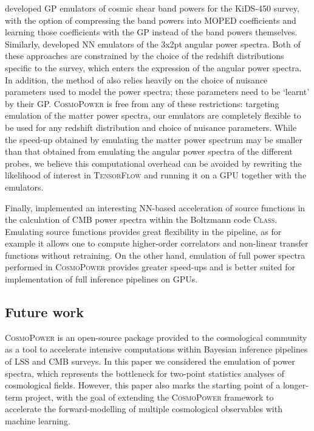\documentclass[fleqn,usenatbib]{mnras}
\begin{document}
\citet{Mootoovaloo20} developed GP emulators of cosmic shear band powers for the KiDS-450 survey, with the option of compressing the band powers into MOPED coefficients and learning those coefficients with the GP instead of the band powers themselves. Similarly, \citet{ManriqueYus19} developed NN emulators of the 3x2pt angular power spectra. Both of these approaches are constrained by the choice of the redshift distributions specific to the survey, which enters the expression of the angular power spectra. In addition, the method of \citet{Mootoovaloo20} also relies heavily on the choice of nuisance parameters used to model the power spectra; these parameters need to be `learnt' by their GP. \textsc{CosmoPower} is free from any of these restrictions: targeting emulation of the matter power spectra, our emulators are completely flexible to be used for any redshift distribution and choice of nuisance parameters. While the speed-up obtained by emulating the matter power spectrum may be smaller than that obtained from emulating the angular power spectra of the different probes, we believe this computational overhead can be avoided by rewriting the likelihood of interest in \textsc{TensorFlow} and running it on a GPU together with the emulators.

Finally, \citet{Albers19} implemented an interesting NN-based acceleration of source functions in the calculation of CMB power spectra within the Boltzmann code \textsc{Class}. Emulating source functions provides great flexibility in the pipeline, as for example it allows one to compute higher-order correlators and non-linear transfer functions without retraining. On the other hand, emulation of full power spectra performed in \textsc{CosmoPower} provides greater speed-ups and is better suited for implementation of full inference pipelines on GPUs.

\subsection{Future work}
\textsc{CosmoPower} is an open-source package provided to the cosmological community as a tool to accelerate intensive computations within Bayesian inference pipelines of LSS and CMB surveys. In this paper we considered the emulation of power spectra, which represents the bottleneck for two-point statistics analyses of cosmological fields. However, this paper also marks the starting point of a longer-term project, with the goal of extending the \textsc{CosmoPower} framework to accelerate the forward-modelling of multiple cosmological observables with machine learning.
\end{document}
